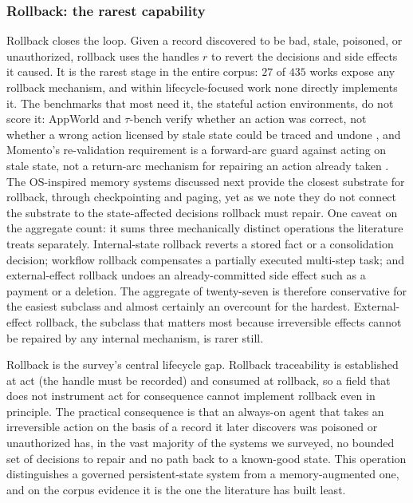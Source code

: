 \subsubsection{Rollback: the rarest capability}

Rollback closes the loop. Given a record discovered to be bad, stale, poisoned, or unauthorized, rollback uses the handles $r$ to revert the decisions and side effects it caused. It is the rarest stage in the entire corpus: $27$ of $435$ works expose any rollback mechanism, and within lifecycle-focused work none directly implements it. The benchmarks that most need it, the stateful action environments, do not score it: AppWorld and $\tau$-bench verify whether an action was correct, not whether a wrong action licensed by stale state could be traced and undone \citep{trivedi-etal-2024-appworld,yao2024taubenchbenchmarktoolagentuserinteraction}, and Momento's re-validation requirement is a forward-arc guard against acting on stale state, not a return-arc mechanism for repairing an action already taken \citep{merin2026momento}. The OS-inspired memory systems discussed next provide the closest substrate for rollback, through checkpointing and paging, yet as we note they do not connect the substrate to the state-affected decisions rollback must repair. One caveat on the aggregate count: it sums three mechanically distinct operations the literature treats separately. Internal-state rollback reverts a stored fact or a consolidation decision; workflow rollback compensates a partially executed multi-step task; and external-effect rollback undoes an already-committed side effect such as a payment or a deletion. The aggregate of twenty-seven is therefore conservative for the easiest subclass and almost certainly an overcount for the hardest. External-effect rollback, the subclass that matters most because irreversible effects cannot be repaired by any internal mechanism, is rarer still.

Rollback is the survey's central lifecycle gap. Rollback traceability is established at act (the handle must be recorded) and consumed at rollback, so a field that does not instrument act for consequence cannot implement rollback even in principle. The practical consequence is that an always-on agent that takes an irreversible action on the basis of a record it later discovers was poisoned or unauthorized has, in the vast majority of the systems we surveyed, no bounded set of decisions to repair and no path back to a known-good state. This operation distinguishes a governed persistent-state system from a memory-augmented one, and on the corpus evidence it is the one the literature has built least.

